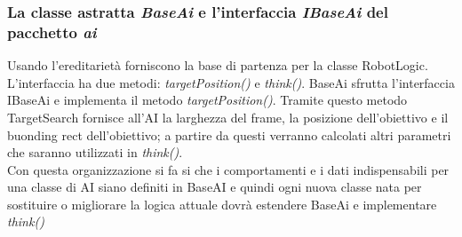 \subsubsection{La classe astratta \emph{BaseAi} e l'interfaccia \emph{IBaseAi} del pacchetto \emph{ai}}
Usando l'ereditarietà forniscono la base di partenza per la classe RobotLogic.\\
L'interfaccia ha due metodi: \emph{targetPosition()} e \emph{think()}.
BaseAi sfrutta l'interfaccia IBaseAi e implementa il metodo \emph{targetPosition()}. 
Tramite questo metodo TargetSearch fornisce all'AI la larghezza del frame, la posizione 
dell'obiettivo e il buonding rect dell'obiettivo; a partire da questi verranno 
calcolati altri parametri che saranno utilizzati in \emph{think()}.\\
Con questa organizzazione si fa si che i comportamenti e i dati indispensabili per una classe di 
AI siano definiti in BaseAI e quindi ogni nuova classe nata per sostituire o migliorare
 la logica attuale dovrà estendere BaseAi e implementare \emph{think()} 

